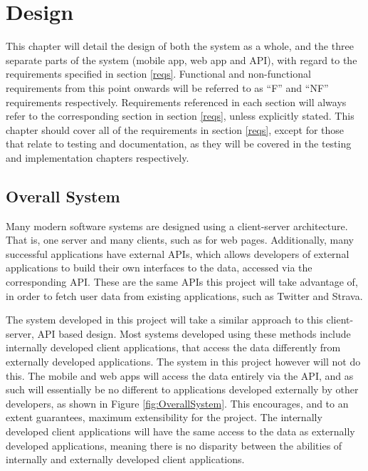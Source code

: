 \documentclass[11pt,openright,a4paper]{report}
\begin{document}
\chapter{Design} \label{chap:design}
This chapter will detail the design of both the system as a whole, and the three separate parts of the system (mobile app, web app and API), with regard to the requirements specified in section \ref{reqs}. Functional and non-functional requirements from this point onwards will be referred to as \enquote{F} and \enquote{NF} requirements respectively. Requirements referenced in each section will always refer to the corresponding section in section \ref{reqs}, unless explicitly stated. This chapter should cover all of the requirements in section \ref{reqs}, except for those that relate to testing and documentation, as they will be covered in the testing and implementation chapters respectively.

\section{Overall System}
Many modern software systems are designed using a client-server architecture. That is, one server and many clients, such as for web pages. Additionally, many successful applications have external APIs, which allows developers of external applications to build their own interfaces to the data, accessed via the corresponding API. These are the same APIs this project will take advantage of, in order to fetch user data from existing applications, such as Twitter and Strava.

The system developed in this project will take a similar approach to this client-server, API based design. Most systems developed using these methods include internally developed client applications, that access the data differently from externally developed applications. The system in this project however will not do this. The mobile and web apps will access the data entirely via the API, and as such will essentially be no different to applications developed externally by other developers, as shown in Figure \ref{fig:OverallSystem}. This encourages, and to an extent guarantees, maximum extensibility for the project. The internally developed client applications will have the same access to the data as externally developed applications, meaning there is no disparity between the abilities of internally and externally developed client applications.
\end{document}
